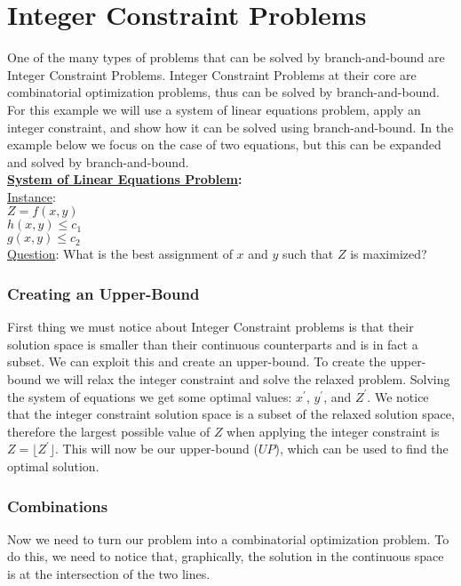 \section{Integer Constraint Problems}
    One of the many types of problems that can be solved by 
    branch-and-bound are Integer Constraint Problems. 
    Integer Constraint Problems at their core are combinatorial 
    optimization problems, thus can be solved by branch-and-bound.
    For this example we will use a system of linear equations problem,
    apply an integer constraint, and show how it can be solved using 
    branch-and-bound. In the example below we focus on the case of 
    two equations, but this can be expanded and solved by branch-and-bound.
    \\ 
    \noindent
	\textbf{\underline{System of Linear Equations Problem}:}\\
	\underline{Instance}: \\ $Z = f(x,y)$  \\ $h(x,y) \leq c_1$ \\ $g(x,y) \leq c_2 $ \\
	\underline{Question}: What is the best assignment of $x$ and $y$ such that $Z$ is maximized?
    \\

        \subsubsection{Creating an Upper-Bound}
        First thing we must notice about Integer Constraint problems is that
        their solution space is smaller than their continuous counterparts and 
        is in fact a subset.
        We can exploit this and create an upper-bound. To create the upper-bound
        we will relax the integer constraint and solve the relaxed problem.
        Solving the system of equations we get some optimal values: $x^{'}$, $y^{'}$, 
        and $Z^{'}$. We notice that the integer constraint solution
        space is a subset of the relaxed solution space, therefore the largest
        possible value of $Z$ when applying the integer constraint is 
        $ Z = \lfloor Z^{'} \rfloor$. This will now be our upper-bound ($UP$), which can be used
        to find the optimal solution.

        \subsubsection{Combinations}
        Now we need to turn our problem into a combinatorial optimization problem.
        To do this, we need to notice that, graphically, the solution in the continuous space is at 
        the intersection of the two lines.\\
        
